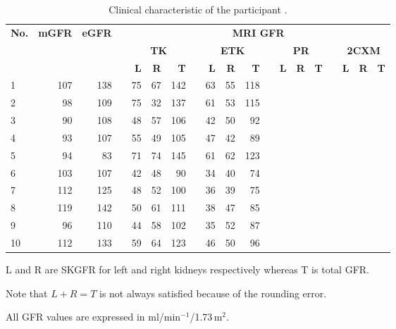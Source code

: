 \begin{landscape}
\begin{table}
\centering
\caption[Clinical characteristic of the participants]{Clinical characteristic of the participant \cite{eikefjord2017dynamic}.}
\label{tab:results}
\begin{threeparttable}
\renewcommand{\arraystretch}{1.5}
\begin{tabular}{l r r c r r r c r r r c r r r c r r r}
	\toprule
	\multirow{3}{*}{\textbf{No.}}&
	\multirow{3}{*}{\textbf{mGFR}}&
	\multirow{3}{*}{\textbf{eGFR}}& \phantom{abc}&
	\multicolumn{15}{c}{\textbf{MRI GFR}}\\ \cmidrule{5-19}
	&&&& \multicolumn{3}{c}{\textbf{TK}} & \phantom{abc}&
    \multicolumn{3}{c}{\textbf{ETK}} & \phantom{abc}&
    \multicolumn{3}{c}{\textbf{PR}} & \phantom{abc}&
    \multicolumn{3}{c}{\textbf{2CXM}}\\
    \cmidrule{5-7} \cmidrule{9-11} \cmidrule{13-15} \cmidrule{17-19}
   \rowcolor{white} &&&& \textbf{L} & \textbf{R} & \textbf{T} & & \textbf{L} & \textbf{R} & \textbf{T} && \textbf{L} & \textbf{R} & \textbf{T} && \textbf{L} & \textbf{R} & \textbf{T}\\ 
    \toprule
  	1  & 107 & 138 & & 75 & 67 & 142 & & 63 & 55 & 118 & & &&&&&&\\
  	2  & 98  & 109 & & 75 & 32 & 137 & & 61 & 53 & 115 & & &&&&&&\\
  	3  & 90  & 108 & & 48 & 57 & 106 & & 42 & 50 & 92  & & &&&&&&\\
  	4  & 93  & 107 & & 55 & 49 & 105 & & 47 & 42 & 89  & & &&&&&&\\
  	5  & 94  & 83  & & 71 & 74 & 145 & & 61 & 62 & 123 & & &&&&&&\\
  	6  & 103 & 107 & & 42 & 48 & 90  & & 34 & 40 & 74  & & &&&&&&\\
  	7  & 112 & 125 & & 48 & 52 & 100 & & 36 & 39 & 75  & & &&&&&&\\
  	8  & 119 & 142 & & 50 & 61 & 111 & & 38 & 47 & 85  & & &&&&&&\\
  	9  & 96  & 110 & & 44 & 58 & 102 & & 35 & 52 & 87  & & &&&&&&\\
  	10 & 112 & 133 & & 59 & 64 & 123 & & 46 & 50 & 96  & & &&&&&&\\

  \bottomrule

\end{tabular}
\begin{tablenotes}%
\footnotesize{}%
\item L and R are SKGFR for left and right kidneys respectively whereas T is total GFR.
\item Note that $L+R = T$ is not always satisfied because of the rounding error.
\item All GFR values are expressed in ml/min$^{-1}$/1.73\,m$^2$.
    \end{tablenotes}
	\end{threeparttable}
\end{table}
\end{landscape}

